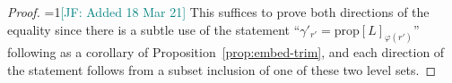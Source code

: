 \documentclass[12pt]{article}
\newcommand{\Comments}{1}
\newcommand{\mynote}[2]{\ifnum\Comments=1\textcolor{#1}{#2}\fi}
\newcommand{\mytodo}[2]{\ifnum\Comments=1%
  \todo[linecolor=#1!80!black,backgroundcolor=#1,bordercolor=#1!80!black]{#2}\fi}
\newcommand{\jessie}[1]{\mynote{teal}{[JF: #1]}}
\newcommand{\jessiet}[1]{\mytodo{teal!20!white}{JF: #1}}
\newcommand{\reals}{\mathbb{R}}
\newcommand{\prop}[1]{\mathrm{prop}[#1]}
\newcommand{\R}{\mathcal{R}}
\begin{document}
\begin{proof}
	\jessie{Added 18 Mar 21}
	This suffices to prove both directions of the equality since there is a subtle use of the statement ``$\gamma'_{r'} = \prop{L}_{\varphi(r')}$'' following as a corollary of Proposition~\ref{prop:embed-trim}, and each direction of the statement follows from a subset inclusion of one of these two level sets. 
	
\end{proof}
\end{document}
